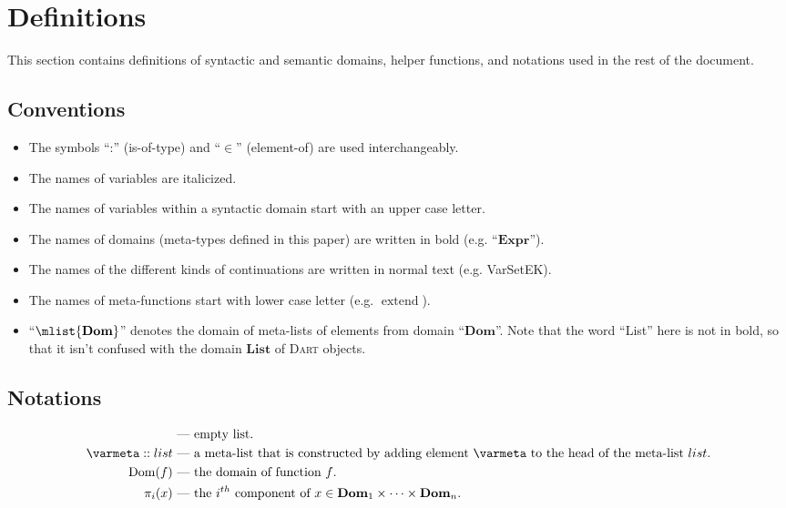 \documentclass[a4paper,oneside,fleqn]{article}
\newcommand{\dart}{\textsc{Dart}}
\DeclareMathOperator{\dom}{Dom} %
\DeclareMathOperator{\extend}{extend}
\newcommand{\dexpr}{\mathbf{Expr}}
\newcommand{\ddom}{\mathbf{Dom}}    %
\newcommand{\dsemlist}{\mathbf{List}}
\begin{document}
\section{Definitions}
\label{sec:definitions}

This section contains definitions of syntactic and semantic domains, helper functions, and notations used in the rest of the document.


\subsection{Conventions}
\label{subsec:conventions}

\begin{itemize}
    \item The symbols ``:'' (is-of-type) and ``$\in$'' (element-of) are used interchangeably.
    \item The names of variables are italicized.
    \item The names of variables within a syntactic domain start with an upper case letter.
    \item The names of domains (meta-types defined in this paper) are written in bold (e.g. ``$\dexpr$'').
    \item The names of the different kinds of continuations are written in normal text (e.g. VarSetEK).
    \item The names of meta-functions start with lower case letter (e.g. $\extend$).
    \item ``$\mlist{\ddom}$'' denotes the domain of meta-lists of elements from domain ``$\ddom$''.
        Note that the word ``List'' here is not in bold, so that it isn't confused with the domain $\dsemlist$ of \dart{} objects.
\end{itemize}

\subsection{Notations}
\label{subsec:notations}

\begin{align*}
    [] &\text{ --- empty list}.\\
    \varmeta :: list &\text{ --- a meta-list that is constructed by adding element $\varmeta$ to the head of the meta-list $list$}.\\
    \dom(f) &\text{ --- the domain of function \(f\)}.\\
    \pi_i(x) &\text{ --- the $i^{th}$ component of $x \in \ddom_1 \times \dots \times \ddom_n$}.
\end{align*}
\end{document}
